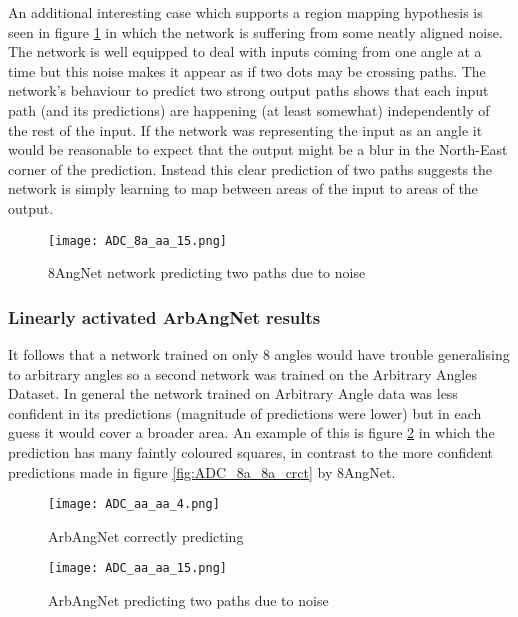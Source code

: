 An additional interesting case which supports a region mapping hypothesis is seen in figure \ref{fig:ADC_8aNoaa_special} in which the network is suffering from some neatly aligned noise. 
The network is well equipped to deal with inputs coming from one angle at a time but this noise makes it appear as if two dots may be crossing paths. 
The network's behaviour to predict two strong output paths shows that each input path (and its predictions) are happening (at least somewhat) independently of the rest of the input.
If the network was representing the input as an angle it would be reasonable to expect that the output might be a blur in the North-East corner of the prediction.  
Instead this clear prediction of two paths suggests the network is simply learning to map between areas of the input to areas of the output. 

\begin{figure}
    \centering
    \texttt{[image: ADC\_8a\_aa\_15.png]}
    \caption{8AngNet network predicting two paths due to noise}
    \label{fig:ADC_8aNoaa_special}
\end{figure}


\subsubsection{Linearly activated ArbAngNet results}
It follows that a network trained on only 8 angles would have trouble generalising to arbitrary angles so a second network was trained on the Arbitrary Angles Dataset. 
In general the network trained on Arbitrary Angle data was less confident in its predictions (magnitude of predictions were lower) but in each guess it would cover a broader area. 
An example of this is figure \ref{fig:ADC_aaaa_crct} in which the prediction has many faintly coloured squares, in contrast to the more confident predictions made in figure \ref{fig:ADC_8a_8a_crct} by 8AngNet.

\begin{figure}[h]
    \centering
    \texttt{[image: ADC\_aa\_aa\_4.png]}
    \caption{ArbAngNet correctly predicting}
    \label{fig:ADC_aaaa_crct}
\end{figure}


\begin{figure}[h]
    \centering
    \texttt{[image: ADC\_aa\_aa\_15.png]}
    \caption{ArbAngNet predicting two paths due to noise}
    \label{fig:ADC_aaaa_twopath}
\end{figure}

